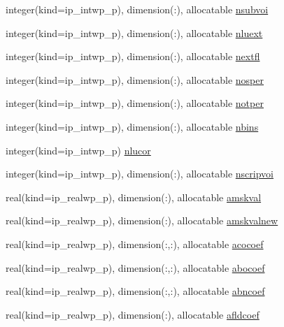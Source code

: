 \begin{DoxyCompactItemize}
integer(kind=ip\+\_\+intwp\+\_\+p), dimension(\+:), allocatable \hyperlink{namespacemod__oasis__namcouple_a0f31605257bfe125aafb6488a5065d4d}{nsubvoi}
\item 
integer(kind=ip\+\_\+intwp\+\_\+p), dimension(\+:), allocatable \hyperlink{namespacemod__oasis__namcouple_a7510ecfe3d0f141252450e4ba66209ba}{nluext}
\item 
integer(kind=ip\+\_\+intwp\+\_\+p), dimension(\+:), allocatable \hyperlink{namespacemod__oasis__namcouple_a8302411d5a02efd9a6dc7f784fbb0d4d}{nextfl}
\item 
integer(kind=ip\+\_\+intwp\+\_\+p), dimension(\+:), allocatable \hyperlink{namespacemod__oasis__namcouple_a484a71c213c89416924a0e23cfd46269}{nosper}
\item 
integer(kind=ip\+\_\+intwp\+\_\+p), dimension(\+:), allocatable \hyperlink{namespacemod__oasis__namcouple_ac154fc90756832bc90d02ea21f7c7e17}{notper}
\item 
integer(kind=ip\+\_\+intwp\+\_\+p), dimension(\+:), allocatable \hyperlink{namespacemod__oasis__namcouple_a4c609c48a20205e1d2aa9938d7babc92}{nbins}
\item 
integer(kind=ip\+\_\+intwp\+\_\+p) \hyperlink{namespacemod__oasis__namcouple_aee9f6849ec644ee40f465976bc6c7b96}{nlucor}
\item 
integer(kind=ip\+\_\+intwp\+\_\+p), dimension(\+:), allocatable \hyperlink{namespacemod__oasis__namcouple_abb6f67bfba2cba424dabee3a465fdfd5}{nscripvoi}
\item 
real(kind=ip\+\_\+realwp\+\_\+p), dimension(\+:), allocatable \hyperlink{namespacemod__oasis__namcouple_a92d43fa5eaaff81f0e3f73b303377c02}{amskval}
\item 
real(kind=ip\+\_\+realwp\+\_\+p), dimension(\+:), allocatable \hyperlink{namespacemod__oasis__namcouple_a3598202174da65117caf675065f8b160}{amskvalnew}
\item 
real(kind=ip\+\_\+realwp\+\_\+p), dimension(\+:,\+:), allocatable \hyperlink{namespacemod__oasis__namcouple_a115cdfe0e05679107363605a992c6386}{acocoef}
\item 
real(kind=ip\+\_\+realwp\+\_\+p), dimension(\+:,\+:), allocatable \hyperlink{namespacemod__oasis__namcouple_a1b3f80e8e19f950b806636caadeb704b}{abocoef}
\item 
real(kind=ip\+\_\+realwp\+\_\+p), dimension(\+:,\+:), allocatable \hyperlink{namespacemod__oasis__namcouple_a211c98282b89859bee6da0ef60f0d484}{abncoef}
\item 
real(kind=ip\+\_\+realwp\+\_\+p), dimension(\+:), allocatable \hyperlink{namespacemod__oasis__namcouple_a19fb86d643bb8761d5a8e32d645d5963}{afldcoef}

\end{DoxyCompactItemize}
